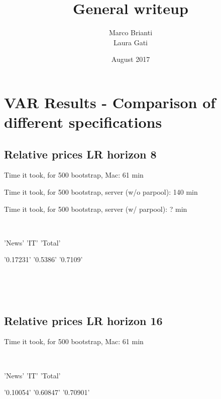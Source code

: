 \documentclass{article}
\title{General writeup}
\author{Marco Brianti\\Laura Gati}
\date{August 2017}
\def \ourFigPath {../}
\begin{document}
	
	\maketitle
	
	\section{VAR Results - Comparison of different specifications}
	
	\subsection{Relative prices LR horizon 8}
	\noindent Time it took, for 500 bootstrap, Mac: 61 min
	
	\noindent  Time it took, for 500 bootstrap, server (w/o parpool): 140 min
	
	\noindent  Time it took, for 500 bootstrap, server (w/ parpool): ? min
	
	\
	
	\noindent  'News'       'IT'        'Total' 
	
         \noindent  '0.17231'    '0.5386'    '0.7109'
         
         
         \
         
         
         
         \

\begin{figure}[h!]
\centering
{} \hspace{.2in%
} 
\end{figure}
 
\newpage
\subsection{Relative prices LR horizon 16}
	\noindent Time it took, for 500 bootstrap, Mac: 61 min
	
	\
	
	\noindent  'News'       'IT'        'Total' 
	
         \noindent  '0.10054'    '0.60847'    '0.70901'
         
         \
         
\end{document}
